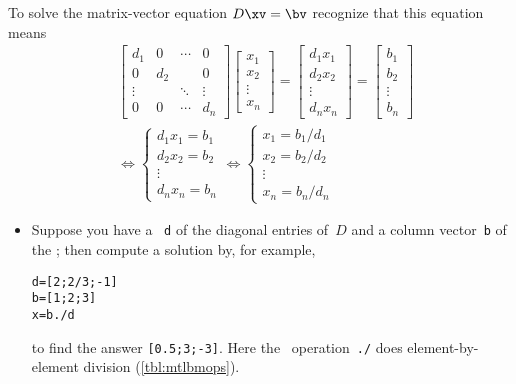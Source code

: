 \begin{compute}
To solve the matrix-vector equation \(D\xv=\bv\) recognize that this equation means
\begin{align}&
\begin{bmatrix} d_1&0&\cdots&0
\\0&d_2&&0
\\\vdots&&\ddots&\vdots
\\0&0&\cdots&d_n \end{bmatrix}
\begin{bmatrix} x_1\\x_2\\\vdots\\x_n \end{bmatrix}
=\begin{bmatrix} d_1x_1\\d_2x_2\\\vdots\\d_nx_n \end{bmatrix}
=\begin{bmatrix} b_1\\b_2\\\vdots\\b_n \end{bmatrix}
\nonumber\\&\iff
\begin{cases} d_1x_1=b_1\\d_2x_2=b_2\\\vdots\\d_nx_n=b_n \end{cases}
\iff
\begin{cases} x_1=b_1/d_1\\x_2=b_2/d_2\\\vdots\\x_n=b_n/d_n \end{cases}
\label{eq:ddslin}
\end{align}
\begin{itemize}
\item Suppose you have a ~\verb|d| of the diagonal entries of~\(D\) and a column vector~\verb|b| of the \rhs; then compute a solution by, for example,
\setbox\ajrqrbox\hbox{}%
\marginajrbox%
\begin{verbatim}
d=[2;2/3;-1]
b=[1;2;3]
x=b./d
\end{verbatim}
to find the answer \verb|[0.5;3;-3]|.
Here the \script\ operation~\verb|./| does  element-by-element division (\cref{tbl:mtlbmops}).


\end{itemize}
\end{compute}
